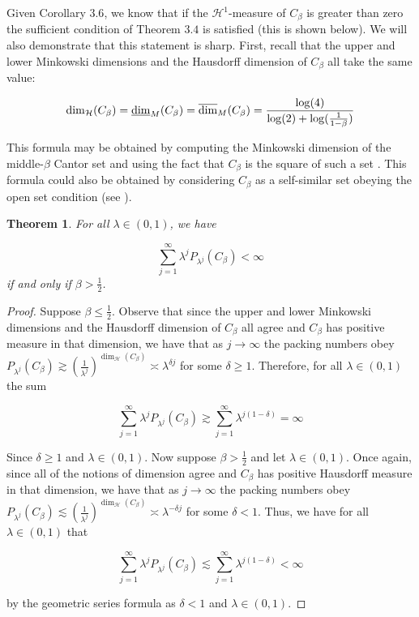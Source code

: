 \documentclass[11pt]{article}
\newtheorem{tm}{Theorem}[section]
\begin{document}
\bigskip

Given Corollary $3.6$, we know that if the $\mathcal{H}^1$-measure of $C_\beta$ is greater than zero the sufficient condition of Theorem $3.4$ is satisfied (this is shown below). We will also demonstrate that this statement is sharp. First, recall that the upper and lower Minkowski dimensions and the Hausdorff dimension of $C_\beta$ all take the same value:

$$\dim_\mathcal{H}(C_\beta) = \underline{\rm{dim}}_M(C_\beta) = \overline{\rm{dim}}_M(C_\beta) = \frac{\log(4)}{\log(2) + \log(\frac{1}{1-\beta})}$$

This formula may be obtained by computing the Minkowski dimension of the middle-$\beta$ Cantor set and using the fact that $C_\beta$ is the square of such a set \cite{bp}. This formula could also be obtained by considering $C_\beta$ as a self-similar set obeying the open set condition (see \cite{mat} \cite{bp}).

\begin{tm}
    For all $\lambda \in (0,1)$, we have 

     $$\sum_{j=1}^\infty \lambda^j P_{\lambda^j}(C_\beta) < \infty $$ if and only if $\beta > \frac{1}{2}$. 

\end{tm}

\begin{proof} Suppose $\beta \leq \frac{1}{2}$. Observe that since the upper and lower Minkowski dimensions and the Hausdorff dimension of $C_\beta$ all agree and $C_\beta$ has positive measure in that dimension, we have that as $j \rightarrow \infty$ the packing numbers obey $P_{\lambda^j}(C_\beta) \gtrsim (\frac{1}{\lambda^j})^{\dim_\mathcal{H}(C_\beta)} \asymp \lambda^{\delta j}$ for some $\delta \geq 1$. Therefore, for all $\lambda \in (0,1)$ the sum 

 $$\sum_{j=1}^\infty \lambda^j P_{\lambda^j}(C_\beta) \gtrsim \sum_{j=1}^\infty \lambda^{j(1 - \delta)} =  \infty $$
 
Since $\delta \geq 1$ and $\lambda \in (0,1)$. Now suppose $\beta > \frac{1}{2}$ and let $\lambda \in (0,1)$. Once again, since all of the notions of dimension agree and $C_\beta$ has positive Hausdorff measure in that dimension, we have that as $j\rightarrow \infty$ the packing numbers obey $P_{\lambda^j}(C_\beta) \lesssim (\frac{1}{\lambda^j})^{\dim_\mathcal{H}(C_\beta)} \asymp \lambda^{-\delta j}$ for some $\delta < 1$. Thus, we have for all $\lambda \in (0,1)$ that 

 $$\sum_{j=1}^\infty \lambda^j P_{\lambda^j}(C_\beta) \lesssim \sum_{j=1}^\infty \lambda^{j(1 - \delta)} < \infty $$

 by the geometric series formula as $\delta < 1$ and $\lambda \in (0,1)$. 

 \end{proof}
\end{document}

